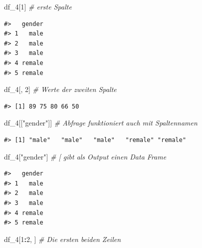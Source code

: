 \documentclass[]{book}
\newenvironment{Shaded}{\begin{snugshade}}{\end{snugshade}}
\newcommand{\DecValTok}[1]{\textcolor[rgb]{0.00,0.00,0.81}{#1}}
\newcommand{\StringTok}[1]{\textcolor[rgb]{0.31,0.60,0.02}{#1}}
\newcommand{\CommentTok}[1]{\textcolor[rgb]{0.56,0.35,0.01}{\textit{#1}}}
\newcommand{\OperatorTok}[1]{\textcolor[rgb]{0.81,0.36,0.00}{\textbf{#1}}}
\newcommand{\NormalTok}[1]{#1}
\begin{document}
\begin{Shaded}
\begin{Highlighting}[]
\NormalTok{df_}\DecValTok{4}\NormalTok{[}\DecValTok{1}\NormalTok{] }\CommentTok{# erste Spalte}
\end{Highlighting}
\end{Shaded}

\begin{verbatim}
#>   gender
#> 1   male
#> 2   male
#> 3   male
#> 4 remale
#> 5 remale
\end{verbatim}

\begin{Shaded}
\begin{Highlighting}[]
\NormalTok{df_}\DecValTok{4}\NormalTok{[, }\DecValTok{2}\NormalTok{] }\CommentTok{# Werte der zweiten Spalte}
\end{Highlighting}
\end{Shaded}

\begin{verbatim}
#> [1] 89 75 80 66 50
\end{verbatim}

\begin{Shaded}
\begin{Highlighting}[]
\NormalTok{df_}\DecValTok{4}\NormalTok{[[}\StringTok{"gender"}\NormalTok{]] }\CommentTok{# Abfrage funktioniert auch mit Spaltennamen}
\end{Highlighting}
\end{Shaded}

\begin{verbatim}
#> [1] "male"   "male"   "male"   "remale" "remale"
\end{verbatim}

\begin{Shaded}
\begin{Highlighting}[]
\NormalTok{df_}\DecValTok{4}\NormalTok{[}\StringTok{"gender"}\NormalTok{] }\CommentTok{# [ gibt als Output einen Data Frame}
\end{Highlighting}
\end{Shaded}

\begin{verbatim}
#>   gender
#> 1   male
#> 2   male
#> 3   male
#> 4 remale
#> 5 remale
\end{verbatim}

\begin{Shaded}
\begin{Highlighting}[]
\NormalTok{df_}\DecValTok{4}\NormalTok{[}\DecValTok{1}\OperatorTok{:}\DecValTok{2}\NormalTok{, ] }\CommentTok{# Die ersten beiden Zeilen}
\end{Highlighting}
\end{Shaded}
\end{document}
